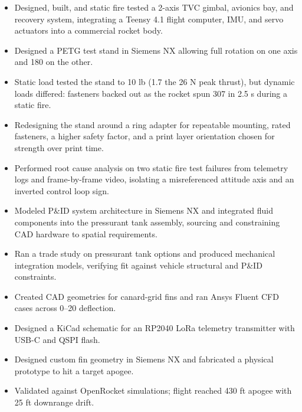 \begin{itemize}
  \item Designed, built, and static fire tested a 2-axis TVC gimbal, avionics bay, and recovery system, integrating a Teensy 4.1 flight computer, IMU, and servo actuators into a commercial rocket body.
  \item Designed a PETG test stand in Siemens NX allowing full rotation on one axis and 180\textdegree{} on the other.
  \item Static load tested the stand to 10 lb (1.7\texttimes{} the 26 N peak thrust), but dynamic loads differed: fasteners backed out as the rocket spun 307\textdegree{} in 2.5 s during a static fire.
  \item Redesigning the stand around a ring adapter for repeatable mounting, rated fasteners, a higher safety factor, and a print layer orientation chosen for strength over print time.
  \item Performed root cause analysis on two static fire test failures from telemetry logs and frame-by-frame video, isolating a misreferenced attitude axis and an inverted control loop sign.
\end{itemize}
\entrygap

\begin{itemize}
  \item Modeled P\&ID system architecture in Siemens NX and integrated fluid components into the pressurant tank assembly, sourcing and constraining CAD hardware to spatial requirements.
  \item Ran a trade study on pressurant tank options and produced mechanical integration models, verifying fit against vehicle structural and P\&ID constraints.
  \item Created CAD geometries for canard-grid fins and ran Ansys Fluent CFD cases across 0--20\textdegree{} deflection.
  \item Designed a KiCad schematic for an RP2040 LoRa telemetry transmitter with USB-C and QSPI flash.
\end{itemize}
\entrygap

\begin{itemize}
  \item Designed custom fin geometry in Siemens NX and fabricated a physical prototype to hit a target apogee.
  \item Validated against OpenRocket simulations; flight reached 430 ft apogee with 25 ft downrange drift.
\end{itemize}
\entrygap

